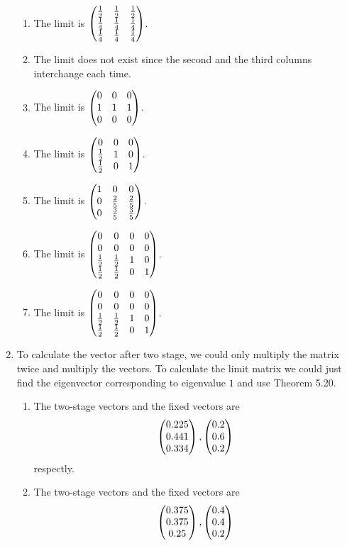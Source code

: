\begin{enumerate}
\begin{enumerate}
\item The limit is $\begin{pmatrix}\frac{1}{2} & \frac{1}{2} & \frac{1}{2}\cr \frac{1}{4} & \frac{1}{4} & \frac{1}{4}\cr \frac{1}{4} & \frac{1}{4} & \frac{1}{4}\end{pmatrix}$.
\item The limit does not exist since the second and the third columns interchange each time.
\item The limit is $\begin{pmatrix}0 & 0 & 0\cr 1 & 1 & 1\cr 0 & 0 & 0\end{pmatrix}$.
\item The limit is $\begin{pmatrix}0 & 0 & 0\cr \frac{1}{2} & 1 & 0\cr \frac{1}{2} & 0 & 1\end{pmatrix}$.
\item The limit is $\begin{pmatrix}1 & 0 & 0\cr 0 & \frac{2}{5} & \frac{2}{5}\cr 0 & \frac{3}{5} & \frac{3}{5}\end{pmatrix}$.
\item The limit is $\begin{pmatrix}0 & 0 & 0 & 0\cr 0 & 0 & 0 & 0\cr \frac{1}{2} & \frac{1}{2} & 1 & 0\cr \frac{1}{2} & \frac{1}{2} & 0 & 1\end{pmatrix}$.
\item The limit is $\begin{pmatrix}0 & 0 & 0 & 0\cr 0 & 0 & 0 & 0\cr \frac{1}{2} & \frac{1}{2} & 1 & 0\cr \frac{1}{2} & \frac{1}{2} & 0 & 1\end{pmatrix}$.
\end{enumerate}
\item To calculate the vector after two stage, we could only multiply the matrix twice and multiply the vectors. To calculate the limit matrix we could just find the eigenvector corresponding to eigenvalue $1$ and use Theorem 5.20.
\begin{enumerate}
\item The two-stage vectors and the fixed vectors are
\[\begin{pmatrix}0.225\cr 0.441\cr 0.334\end{pmatrix},\begin{pmatrix}0.2\cr 0.6\cr 0.2\end{pmatrix}\]
respectly.
\item The two-stage vectors and the fixed vectors are
\[\begin{pmatrix}0.375\cr 0.375\cr 0.25\end{pmatrix},\begin{pmatrix}0.4\cr 0.4\cr 0.2\end{pmatrix}\]

\end{enumerate}
\end{enumerate}
